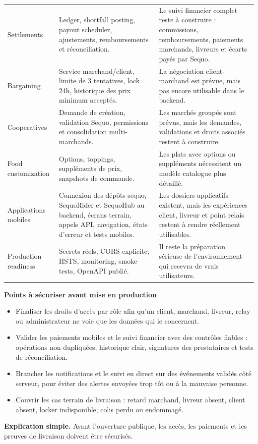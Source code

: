 \documentclass[11pt,letterpaper]{article}
\newcommand{\sectiontitle}[1]{%
  \vspace{0.55em}
  {\Large\bfseries\color{SequoInk}#1}\par
  \vspace{0.1em}
}
\newcommand{\simpleexplanation}[1]{%
  {\small\textbf{\color{SequoBlue}Explication simple.} \color{SequoMuted}#1\par}
}
\begin{document}
{\begin{longtable}{@{}L{3.35cm}L{6.15cm}L{6.7cm}@{}}
Settlements & Ledger, shortfall posting, payout scheduler, ajustements, remboursements et réconciliation. & Le suivi financier complet reste à construire : commissions, remboursements, paiements marchands, livreurs et écarts payés par Sequo. \\
Bargaining & Service marchand/client, limite de 3 tentatives, lock 24h, historique des prix minimum acceptés. & La négociation client-marchand est prévue, mais pas encore utilisable dans le backend. \\
Cooperatives & Demande de création, validation Sequo, permissions et consolidation multi-marchands. & Les marchés groupés sont prévus, mais les demandes, validations et droits associés restent à construire. \\
Food customization & Options, toppings, suppléments de prix, snapshots de commande. & Les plats avec options ou suppléments nécessitent un modèle catalogue plus détaillé. \\
Applications mobiles & Connexion des dépôts sequo, SequoRider et SequoHub au backend, écrans terrain, appels API, navigation, états d'erreur et tests mobiles. & Les dossiers applicatifs existent, mais les expériences client, livreur et point relais restent à rendre réellement utilisables. \\
Production readiness & Secrets réels, CORS explicite, HSTS, monitoring, smoke tests, OpenAPI publié. & Il reste la préparation sérieuse de l'environnement qui recevra de vrais utilisateurs. \\
\bottomrule
\end{longtable}
}

\sectiontitle{Points à sécuriser avant mise en production}
\begin{itemize}
  \item Finaliser les droits d'accès par rôle afin qu'un client, marchand, livreur, relay ou administrateur ne voie que les données qui le concernent.
  \item Valider les paiements mobiles et le suivi financier avec des contrôles fiables : opérations non dupliquées, historique clair, signatures des prestataires et tests de réconciliation.
  \item Brancher les notifications et le suivi en direct sur des événements validés côté serveur, pour éviter des alertes envoyées trop tôt ou à la mauvaise personne.
  \item Couvrir les cas terrain de livraison : retard marchand, livreur absent, client absent, locker indisponible, colis perdu ou endommagé.
\end{itemize}
\simpleexplanation{Avant l'ouverture publique, les accès, les paiements et les preuves de livraison doivent être sécurisés.}
\end{document}
